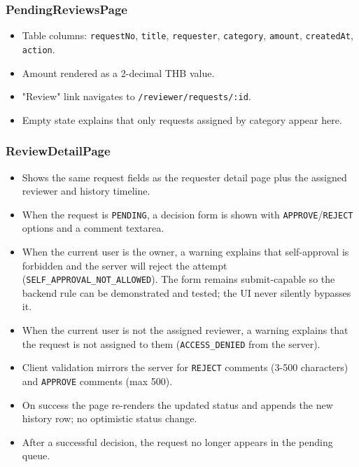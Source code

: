 \documentclass[11pt,a4paper]{article}
\begin{document}
\subsubsection{PendingReviewsPage}

\begin{itemize}[leftmargin=*,itemsep=2pt,topsep=2pt]
  \item Table columns: \texttt{requestNo}, \texttt{title}, \texttt{requester}, \texttt{category}, \texttt{amount}, \texttt{createdAt}, \texttt{action}.
  \item Amount rendered as a 2-decimal THB value.
  \item "Review" link navigates to \texttt{/reviewer/requests/:id}.
  \item Empty state explains that only requests assigned by category appear here.
\end{itemize}
\subsubsection{ReviewDetailPage}

\begin{itemize}[leftmargin=*,itemsep=2pt,topsep=2pt]
  \item Shows the same request fields as the requester detail page plus the assigned reviewer and history timeline.
  \item When the request is \texttt{PENDING}, a decision form is shown with \texttt{APPROVE}/\texttt{REJECT} options and a comment textarea.
  \item When the current user is the owner, a warning explains that self-approval is forbidden and the server will reject the attempt (\texttt{SELF\_APPROVAL\_NOT\_ALLOWED}). The form remains submit-capable so the backend rule can be demonstrated and tested; the UI never silently bypasses it.
  \item When the current user is not the assigned reviewer, a warning explains that the request is not assigned to them (\texttt{ACCESS\_DENIED} from the server).
  \item Client validation mirrors the server for \texttt{REJECT} comments (3-500 characters) and \texttt{APPROVE} comments (max 500).
  \item On success the page re-renders the updated status and appends the new history row; no optimistic status change.
  \item After a successful decision, the request no longer appears in the pending queue.
\end{itemize}
\end{document}
